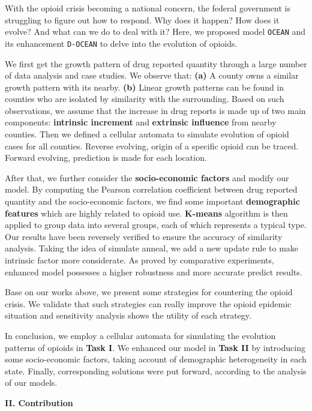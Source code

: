 \documentclass[a4paper]{article}
\begin{document}
\large{With the opioid crisis becoming a national concern, the federal government is struggling to figure out how to respond. Why does it happen? How does it evolve? And what can we do to deal with it? Here, we proposed model \texttt{OCEAN} and its enhancement \texttt{D-OCEAN} to delve into the evolution of opioids.

We first get the growth pattern of drug reported quantity through a large number of data analysis and case studies. We observe that: \textbf{(a)} A county owns a similar growth pattern with its nearby.  \textbf{(b)} Linear growth patterns can be found in counties who are isolated by similarity with the surrounding. Based on such observations, we assume that the increase in drug reports is made up of two main components: \textbf{intrinsic increment} and \textbf{extrinsic influence} from nearby counties. Then we defined a cellular automata to simulate evolution of opioid cases for all counties. Reverse evolving, origin of a specific opioid can be traced. Forward evolving, prediction is made for each location.

After that, we further consider the \textbf{socio-economic factors} and modify our model. By computing the Pearson correlation coefficient between drug reported quantity and the socio-economic factors, we find some important \textbf{demographic features} which are highly related to opioid use. \textbf{K-means} algorithm is then applied to group data into several groups, each of which represents a typical type. Our results have been reversely verified to ensure the accuracy of similarity analysis. Taking the idea of simulate anneal, we add a new update rule to make intrinsic factor more considerate. As proved by comparative experiments, enhanced model possesses a higher robustness and more accurate predict results.

Base on our works above, we present some strategies for countering the opioid crisis. We validate that such strategies can really improve the opioid epidemic situation and sensitivity analysis shows the utility of each strategy. 

In conclusion, we employ a cellular automata for simulating the evolution patterns of opioids in \textbf{Task I}. We enhanced our model in \textbf{Task II} by introducing some socio-economic factors, taking account of demographic heterogeneity in each state. Finally, corresponding solutions were put forward, according to the analysis of our models.}



\vspace{5mm}
\begin{center}
\LARGE\textbf{II. Contribution} \\
\end{center}
\vspace{2mm}
\end{document}
